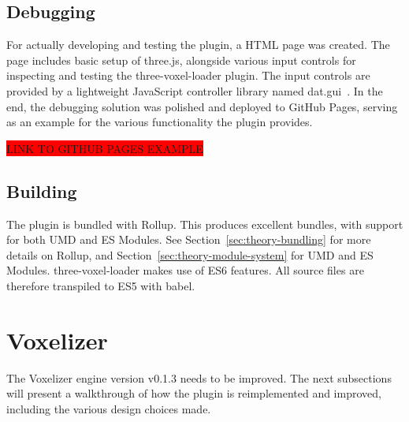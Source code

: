 \subsection{Debugging}
For actually developing and testing the plugin, a HTML page was created. The page includes basic setup of three.js, alongside various input controls for inspecting and testing the three-voxel-loader plugin. The input controls are provided by a lightweight JavaScript controller library named dat.gui~\cite{dat.gui}. In the end, the debugging solution was polished and deployed to GitHub Pages, serving as an example for the various functionality the plugin provides.

\colorbox{red}{LINK TO GITHUB PAGES EXAMPLE}

\subsection{Building}
The plugin is bundled with Rollup. This produces excellent bundles, with support for both UMD and ES Modules. See Section~\ref{sec:theory-bundling} for more details on Rollup, and Section~\ref{sec:theory-module-system} for UMD and ES Modules. three-voxel-loader makes use of ES6 features. All source files are therefore transpiled to ES5 with babel.

\section{Voxelizer}
The Voxelizer engine version v0.1.3 needs to be improved. The next subsections will present a walkthrough of how the plugin is reimplemented and improved, including the various design choices made.

